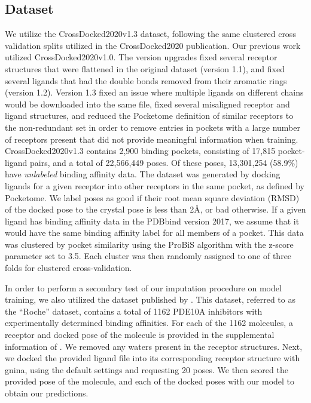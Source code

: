 \documentclass[journal=jcim,manuscript=article]{achemso}
\begin{document}
\subsection{Dataset}
We utilize the CrossDocked2020v1.3 dataset, following the same clustered cross validation splits utilized in the CrossDocked2020 publication.\cite{crossdocked2020}
Our previous work utilized CrossDocked2020v1.0\cite{crossdocked2020}.
The version upgrades fixed several receptor structures that were flattened in the original dataset (version 1.1), and fixed several ligands that had the double bonds removed from their aromatic rings (version 1.2).
Version 1.3 fixed an issue where multiple ligands on different chains would be downloaded into the same file, fixed several misaligned receptor and ligand structures, and reduced the Pocketome definition of similar receptors to the non-redundant set in order to remove entries in pockets with a large number of receptors present that did not provide meaningful information when training.
CrossDocked2020v1.3 contains 2,900 binding pockets, consisting of 17,815 pocket-ligand pairs, and a total of 22,566,449 poses.
Of these poses, 13,301,254 (58.9\%) have \emph{unlabeled} binding affinity data.
The dataset was generated by docking ligands for a given receptor into other receptors in the same pocket, as defined by Pocketome\cite{pocketome}.
We label poses as good if their root mean square deviation (RMSD) of the docked pose to the crystal pose is less than 2{\AA}, or bad otherwise.
If a given ligand has binding affinity data in the PDBbind version 2017, we assume that it would have the same binding affinity label for all members of a pocket.
This data was clustered by pocket similarity using the ProBiS \cite{ProBiS} algorithm with the z-score parameter set to 3.5.
Each cluster was then randomly assigned to one of three folds for clustered cross-validation.

In order to perform a secondary test of our imputation procedure on model training, we also utilized the dataset published by \citet{tosstorff2022high}.
This dataset, referred to as the ``Roche'' dataset, contains a total of 1162 PDE10A inhibitors with experimentally determined binding affinities.
For each of the 1162 molecules, a receptor and docked pose of the molecule is provided in the supplemental information of \citet{tosstorff2022high}.
We removed any waters present in the receptor structures.
Next, we docked the provided ligand file into its corresponding receptor structure with gnina, using the default settings and requesting 20 poses.
We then scored the provided pose of the molecule, and each of the docked poses with our model to obtain our predictions.
\end{document}
